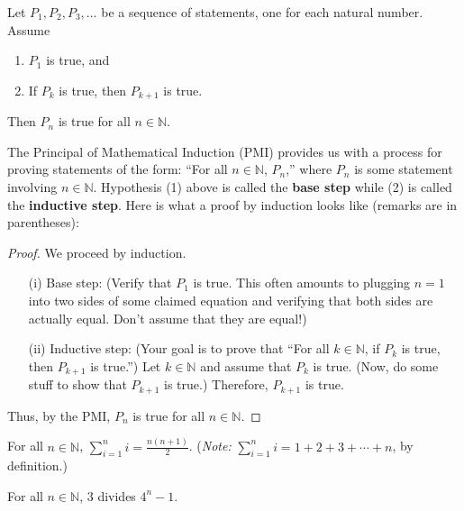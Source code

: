 \begin{theorem}
Let $P_{1}, P_{2}, P_{3}, \ldots$ be a sequence of statements, one for each natural number.  Assume
\begin{enumerate}
\item $P_{1}$ is true, and
\item If $P_{k}$ is true, then $P_{k+1}$ is true.
\end{enumerate}
Then $P_{n}$ is true for all $n\in\mathbb{N}$.
\end{theorem}

\begin{remark}
The Principal of Mathematical Induction (PMI) provides us with a process for proving statements of the form: ``For all $n\in\mathbb{N}$, $P_{n}$,'' where $P_{n}$ is some statement involving $n\in \mathbb{N}$.  Hypothesis (1) above is called the \textbf{base step} while (2) is called the \textbf{inductive step}.  Here is what a proof by induction looks like (remarks are in parentheses):

\bigskip

\begin{proof}
We proceed by induction.
\begin{enumerate}
\item[(i)] Base step: (Verify that $P_{1}$ is true.  This often amounts to plugging $n=1$ into two sides of some claimed equation and verifying that both sides are actually equal.  Don't assume that they are equal!)

\item[(ii)] Inductive step:  (Your goal is to prove that ``For all $k\in\mathbb{N}$, if $P_{k}$ is true, then $P_{k+1}$ is true.'')  Let $k\in\mathbb{N}$ and assume that $P_{k}$ is true.  (Now, do some stuff to show that $P_{k+1}$ is true.)  Therefore, $P_{k+1}$ is true.
\end{enumerate}
Thus, by the PMI, $P_{n}$ is true for all $n\in\mathbb{N}$.
\end{proof}

\end{remark}

\begin{problem}[*]
For all $n\in\mathbb{N}$, $\displaystyle \sum_{i=1}^{n}i=\frac{n(n+1)}{2}$.  (\emph{Note:} $\displaystyle \sum_{i=1}^{n}i=1+2+3+\cdots +n$, by definition.)
\end{problem}

\begin{problem}[*]
For all $n\in\mathbb{N}$, 3 divides $4^{n}-1$.
\end{problem}


